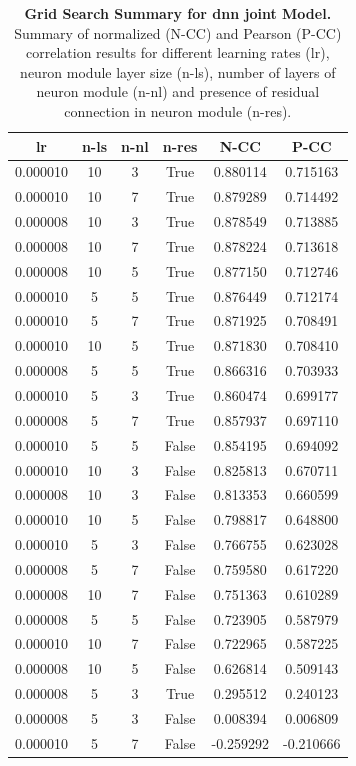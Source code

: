 \begin{table}
    \centering\footnotesize\sf
    \begin{tabular}{cccccc}
    \toprule
    lr & n-ls & n-nl & n-res & N-CC & P-CC \\
    \midrule
    0.000010 & 10 & 3 & True & 0.880114 & 0.715163 \\
    0.000010 & 10 & 7 & True & 0.879289 & 0.714492 \\
    0.000008 & 10 & 3 & True & 0.878549 & 0.713885 \\
    0.000008 & 10 & 7 & True & 0.878224 & 0.713618 \\
    0.000008 & 10 & 5 & True & 0.877150 & 0.712746 \\
    0.000010 & 5 & 5 & True & 0.876449 & 0.712174 \\
    0.000010 & 5 & 7 & True & 0.871925 & 0.708491 \\
    0.000010 & 10 & 5 & True & 0.871830 & 0.708410 \\
    0.000008 & 5 & 5 & True & 0.866316 & 0.703933 \\
    0.000010 & 5 & 3 & True & 0.860474 & 0.699177 \\
    0.000008 & 5 & 7 & True & 0.857937 & 0.697110 \\
    0.000010 & 5 & 5 & False & 0.854195 & 0.694092 \\
    0.000010 & 10 & 3 & False & 0.825813 & 0.670711 \\
    0.000008 & 10 & 3 & False & 0.813353 & 0.660599 \\
    0.000010 & 10 & 5 & False & 0.798817 & 0.648800 \\
    0.000010 & 5 & 3 & False & 0.766755 & 0.623028 \\
    0.000008 & 5 & 7 & False & 0.759580 & 0.617220 \\
    0.000008 & 10 & 7 & False & 0.751363 & 0.610289 \\
    0.000008 & 5 & 5 & False & 0.723905 & 0.587979 \\
    0.000010 & 10 & 7 & False & 0.722965 & 0.587225 \\
    0.000008 & 10 & 5 & False & 0.626814 & 0.509143 \\
    0.000008 & 5 & 3 & True & 0.295512 & 0.240123 \\
    0.000008 & 5 & 3 & False & 0.008394 & 0.006809 \\
    0.000010 & 5 & 7 & False & -0.259292 & -0.210666 \\
    \bottomrule
    \end{tabular}
    \caption{\textbf{Grid Search Summary for dnn joint Model.} Summary of normalized (N-CC) and Pearson (P-CC) correlation results for different learning rates (lr), neuron module layer size (n-ls), number of layers of neuron module (n-nl) and presence of residual connection in neuron module (n-res).}
    \label{tab:grid_dnn_joint}
\end{table}

